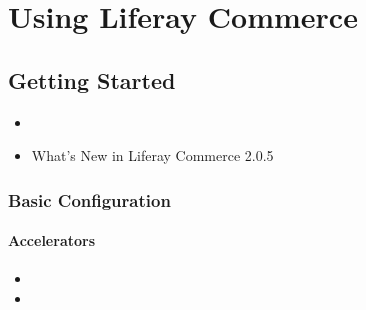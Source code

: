 \documentclass[letterpaper,10pt,english]{sphinxmanual}
\begin{document}
\chapter{Using Liferay Commerce}
\label{\detokenize{product/user-guide/README:using-liferay-commerce}}\label{\detokenize{product/user-guide/README::doc}}

\section{Getting Started}
\label{\detokenize{product/user-guide/README:getting-started}}\begin{itemize}
\item {} 

\item {} 
What’s New in Liferay Commerce 2.0.5

\end{itemize}


\subsection{Basic Configuration}
\label{\detokenize{product/user-guide/README:basic-configuration}}

\subsubsection{Accelerators}
\label{\detokenize{product/user-guide/README:accelerators}}\begin{itemize}
\item {} 

\item {} 

\end{itemize}
\end{document}
